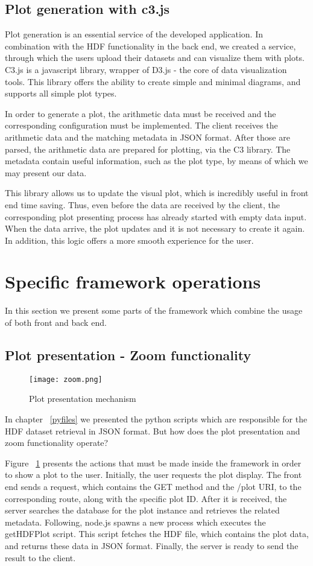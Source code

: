 \subsection{Plot generation with c3.js}
Plot generation is an essential service of the developed application. In combination with the HDF functionality in the back end, we created a service, through which the users upload their datasets and can visualize them with plots. C3.js is a javascript library, wrapper of D3.js - the core of data visualization tools. This library offers the ability to create simple and minimal diagrams, and supports all simple plot types. \par 
	In order to generate a plot, the arithmetic data must be received and the corresponding configuration must be implemented. The client receives the arithmetic data and the matching metadata in JSON format. After those are parsed, the arithmetic data are prepared for plotting, via the C3 library. The metadata contain useful information, such as the plot type, by means of which we may present our data. \par 
	This library allows us to update the visual plot, which is incredibly useful in front end time saving. Thus, even before the data are received by the client, the corresponding plot presenting process has already started with empty data input. When the data arrive, the plot updates and it is not necessary to create it again. In addition, this logic offers a more smooth experience for the user.
	
\section{Specific framework operations}
In this section we present some parts of the framework which combine the usage of both front and back end.

\subsection{Plot presentation - Zoom functionality}
\begin{figure}
	\centerline{\texttt{[image: zoom.png]}}
	\caption{Plot presentation mechanism}
	\label{zoom}
\end{figure}
In chapter ~\ref{pyfiles} we presented the python scripts which are responsible for the HDF dataset retrieval in JSON format. But how does the plot presentation and zoom functionality operate?\par 
	Figure ~\ref{zoom} presents the actions that must be made inside the framework in order to show a plot to the user. Initially, the user requests the plot display. The front end sends a request, which contains the GET method and the /plot URI, to the corresponding route, along with the specific plot ID. After it is received, the server searches the database for the plot instance and retrieves the related metadata. Following, node.js spawns a new process which executes the getHDFPlot script. This script fetches the HDF file, which contains the plot data, and returns these data in JSON format. Finally, the server is ready to send the result to the client. \par 
	
